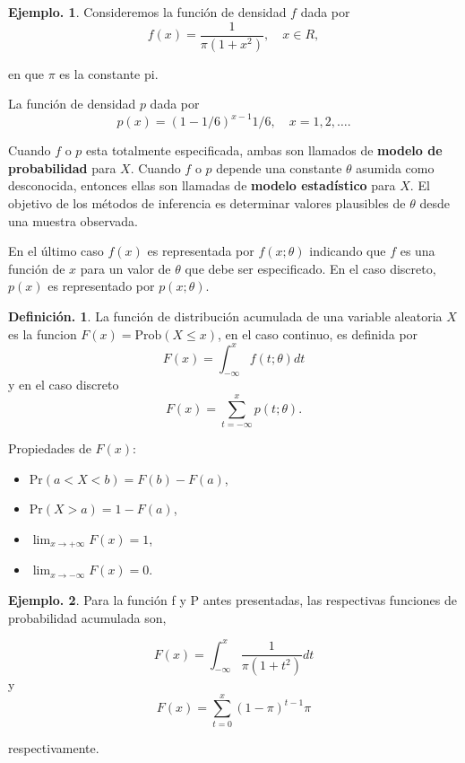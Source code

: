 \documentclass[]{book}
\providecommand{\tightlist}{%
  \setlength{\itemsep}{0pt}\setlength{\parskip}{0pt}}
\theoremstyle{definition}
\newtheorem{definition}{Definición.}[chapter]
\theoremstyle{definition}
\newtheorem{example}{Ejemplo.}[chapter]
\theoremstyle{definition}
\theoremstyle{remark}
\begin{document}
\begin{example}
\protect\hypertarget{exm:unnamed-chunk-133}{}{\label{exm:unnamed-chunk-133} }
Consideremos la función de densidad \(f\) dada por
\[f(x)= \frac{1}{\pi(1+x^2)}, \quad x\in R, \]

en que \(\pi\) es la constante pi.

La función de densidad \(p\) dada por
\[p(x)=(1-1/6)^{x-1}1/6, \quad x=1,2,\ldots. \]
\end{example}

Cuando \(f\) o \(p\) esta totalmente especificada, ambas son
llamados de \textbf{modelo de probabilidad} para \(X\). Cuando \(f\) o
\(p\) depende una constante \(\theta\) asumida como
desconocida, entonces ellas son llamadas de \textbf{modelo
estadístico} para \(X\). El objetivo de los métodos de
inferencia es determinar valores plausibles de \(\theta\)
desde una muestra observada.

En el último caso \(f(x)\) es representada por
\(f(x;\theta)\) indicando que \(f\) es una función de \(x\)
para un valor de \(\theta\) que debe ser especificado. En el
caso discreto, \(p(x)\) es representado por \(p(x;\theta)\).

\begin{definition}
\protect\hypertarget{def:unnamed-chunk-134}{}{\label{def:unnamed-chunk-134} }
La función de distribución acumulada de una variable
aleatoria \(X\) es la funcion \(F(x)= \mbox{Prob}(X\leq x)\), en
el caso
continuo, es definida por
\[ F(x)= \int_{-\infty}^x f(t;\theta)dt \]
y en el caso discreto
\[ F(x)=\sum_{t=-\infty}^{x}p(t;\theta).\]

Propiedades de \(F(x)\):

\begin{itemize}
\tightlist
\item
  Pr\((a<X<b) = F(b)- F(a)\),
\item
  Pr\((X>a) = 1- F(a)\),
\item
  \(\lim_{x\to + \infty}F(x) =1\),\\
\item
  \(\lim_{x\to - \infty}F(x)=0\).
\end{itemize}
\end{definition}

\begin{example}
\protect\hypertarget{exm:unnamed-chunk-135}{}{\label{exm:unnamed-chunk-135} }Para la función f y P antes presentadas, las respectivas funciones de
probabilidad acumulada son,

\[F(x)= \int_{-\infty}^{x} \frac{1}{\pi(1+t^2)} dt \]
y
\[ F(x)= \sum_{t= 0}^{x} (1-\pi)^{t-1}\pi  \]

respectivamente.
\end{example}
\end{document}
